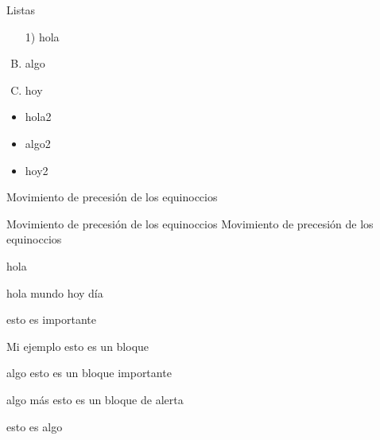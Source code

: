 \documentclass[utf8,spanish,
xcolor={x11names, table}]{beamer}
\begin{document}
\begin{frame}{Listas}
\begin{enumerate}[A)]%
	\item[1)] hola
	\item algo
	\item hoy
\end{enumerate}

\begin{itemize}
	\item hola2
	\item algo2
	\item hoy2
\end{itemize}

\begin{description}[MMMMMM] %
	\item [casa] Movimiento de precesión de los equinoccios
	
	\item [mesa] Movimiento de precesión de los equinoccios Movimiento de precesión de los equinoccios
	
	\item [silla] hola
\end{description}
\end{frame}

\begin{frame}
	hola mundo \alert{hoy} día\newline%
	
	\begin{alertenv}
		esto es importante
	\end{alertenv}
\end{frame}

\begin{frame}
\justifying%
\lipsum[4]
\end{frame}

\begin{frame}
	\begin{block}{Mi ejemplo}
		esto es un bloque
	\end{block}

	\begin{exampleblock}{algo}
		esto es un bloque importante%
	\end{exampleblock}

	\begin{alertblock}{algo más}
	esto es un bloque de alerta
	\end{alertblock}
\end{frame}

\begin{frame}
	\begin{example}
		esto es algo
	\end{example}
\end{frame}
\end{document}
